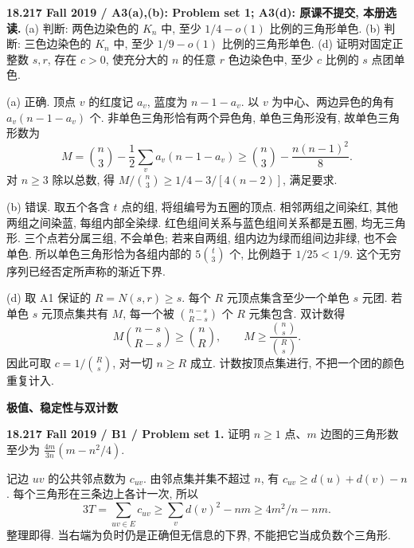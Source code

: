 \begin{exercise}\label{mit:18217-a3}
\textbf{18.217 Fall 2019 / A3(a),(b): Problem set 1; A3(d): 原课不提交, 本册选读.}
(a) 判断: 两色边染色的 $K_n$ 中, 至少 $1/4-o(1)$ 比例的三角形单色.
(b) 判断: 三色边染色的 $K_n$ 中, 至少 $1/9-o(1)$ 比例的三角形单色.
(d) 证明对固定正整数 $s,r$, 存在 $c>0$, 使充分大的 $n$ 的任意 $r$ 色边染色中, 至少 $c$ 比例的 $s$ 点团单色.
\end{exercise}
\begin{solution}
(a) 正确. 顶点 $v$ 的红度记 $a_v$, 蓝度为 $n-1-a_v$. 以 $v$ 为中心、两边异色的角有 $a_v(n-1-a_v)$ 个. 非单色三角形恰有两个异色角, 单色三角形没有, 故单色三角形数为
\[
M=\binom n3-\frac12\sum_va_v(n-1-a_v)
\ge\binom n3-\frac{n(n-1)^2}{8}.
\]
对 $n\ge3$ 除以总数, 得 $M/\binom n3\ge1/4-3/[4(n-2)]$, 满足要求.

(b) 错误. 取五个各含 $t$ 点的组, 将组编号为五圈的顶点. 相邻两组之间染红, 其他两组之间染蓝, 每组内部全染绿. 红色组间关系与蓝色组间关系都是五圈, 均无三角形. 三个点若分属三组, 不会单色; 若来自两组, 组内边为绿而组间边非绿, 也不会单色. 所以单色三角形恰为各组内部的 $5\binom t3$ 个, 比例趋于 $1/25<1/9$. 这个无穷序列已经否定所声称的渐近下界.

(d) 取 A1 保证的 $R=N(s,r)\ge s$. 每个 $R$ 元顶点集含至少一个单色 $s$ 元团. 若单色 $s$ 元顶点集共有 $M$, 每一个被 $\binom{n-s}{R-s}$ 个 $R$ 元集包含. 双计数得
\[
M\binom{n-s}{R-s}\ge\binom nR,
\qquad M\ge\frac{\binom ns}{\binom Rs}.
\]
因此可取 $c=1/\binom Rs$, 对一切 $n\ge R$ 成立. 计数按顶点集进行, 不把一个团的颜色重复计入.
\end{solution}

\par\medskip\noindent\textbf{极值、稳定性与双计数}\par
\begin{exercise}\label{mit:18217-b1}
\textbf{18.217 Fall 2019 / B1 / Problem set 1.}
证明 $n\ge1$ 点、$m$ 边图的三角形数至少为 $\frac{4m}{3n}(m-n^2/4)$.
\end{exercise}
\begin{solution}
记边 $uv$ 的公共邻点数为 $c_{uv}$. 由邻点集并集不超过 $n$, 有 $c_{uv}\ge d(u)+d(v)-n$. 每个三角形在三条边上各计一次, 所以
\[
3T=\sum_{uv\in E}c_{uv}\ge\sum_vd(v)^2-nm
\ge4m^2/n-nm.
\]
整理即得. 当右端为负时仍是正确但无信息的下界, 不能把它当成负数个三角形.
\end{solution}


